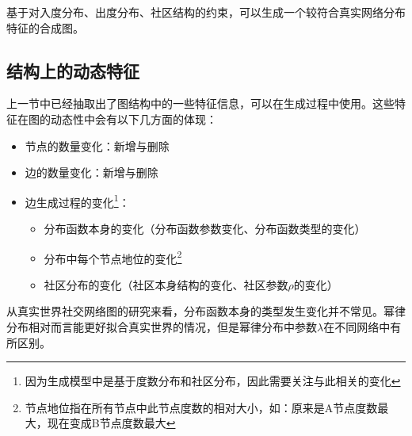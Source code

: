 基于对入度分布、出度分布、社区结构的约束，可以生成一个较符合真实网络分布特征的合成图。

\subsection{结构上的动态特征}

上一节中已经抽取出了图结构中的一些特征信息，可以在生成过程中使用。这些特征在图的动态性中会有以下几方面的体现：

\begin{itemize}
    \item 节点的数量变化：新增与删除
    \item 边的数量变化：新增与删除
    \item 边生成过程的变化\footnote{因为生成模型中是基于度数分布和社区分布，因此需要关注与此相关的变化}：
    \begin{itemize}
        \item 分布函数本身的变化（分布函数参数变化、分布函数类型的变化）
        \item 分布中每个节点地位的变化\footnote{节点地位指在所有节点中此节点度数的相对大小，如：原来是A节点度数最大，现在变成B节点度数最大}
        \item 社区分布的变化（社区本身结构的变化、社区参数$\rho$的变化）
    \end{itemize}
\end{itemize}

\vspace{0.2cm}

从真实世界社交网络图的研究来看，分布函数本身的类型发生变化并不常见。幂律分布相对而言能更好拟合真实世界的情况，但是幂律分布中参数$\lambda$在不同网络中有所区别。

